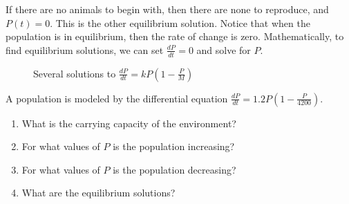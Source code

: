 If there are no animals to begin with, then there are none to reproduce, and 
$P(t) = 0$. This is the other equilibrium solution. Notice that when the 
population is in equilibrium, then the rate of change is zero. Mathematically, 
to find equilibrium solutions, we can set $\frac{dP}{dt} = 0$ and solve for $P$. 

\begin{figure}
\centering
    \caption{Several solutions to $\frac{dP}{dt} = kP \left( 1 - \frac{P}{M} 
    \right)$}
    \label{logdiff}
\end{figure}

\begin{Exercise}[label = logdiff1]
A population is modeled by the differential equation $\frac{dP}{dt} = 1.2P 
\left( 1 - \frac{P}{4200} \right)$.
\begin{enumerate}
\item What is the carrying capacity of the environment?
\item For what values of $P$ is the population increasing?
\item For what values of $P$ is the population decreasing?
\item What are the equilibrium solutions?
\end{enumerate}
\end{Exercise}

